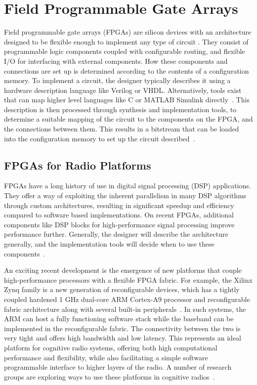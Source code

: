 \section{Field Programmable Gate Arrays }
Field programmable gate arrays (FPGAs) are silicon devices with an architecture designed to be flexible enough to implement any type of circuit \cite{Kuon2008}.
They consist of programmable logic components coupled with configurable routing, and flexible I/O for interfacing with external components.
How these components and connections are set up is determined according to the contents of a configuration memory.
To implement a circuit, the designer typically describes it using a hardware description language like Verilog or VHDL.
Alternatively, tools exist that can map higher level languages like C or MATLAB Simulink directly~\cite{Springer2008}.
This description is then processed through synthesis and implementation tools, to determine a suitable mapping of the circuit to the components on the FPGA, and the connections between them.
This results in a bitstream that can be loaded into the configuration memory to set up the circuit described~\cite{Xilinx2013c}.
\subsection{FPGAs for Radio Platforms}
FPGAs have a long history of use in digital signal processing (DSP) applications.
They offer a way of exploiting the inherent parallelism in many DSP algorithms through custom architectures, resulting in significant speedup and efficiency compared to software based implementations.
On recent FPGAs, additional components like DSP blocks for high-performance signal processing improve performance further.
Generally, the designer will describe the architecture generally, and the implementation tools will decide when to use these components~\cite{Xilinx2013d}.

An exciting recent development is the emergence of new platforms that couple high-performance processors with a flexible FPGA fabric.
For example, the Xilinx Zynq family is a new generation of reconfigurable devices, which has a tightly coupled hardened 1 GHz dual-core ARM Cortex-A9 processor and reconfigurable fabric architecture along with several built-in peripherals~\cite{Xilinx2013}.
In such systems, the ARM can host a fully functioning software stack while the baseband can be implemented in the reconfigurable fabric. The connectivity between the two is very tight and offers high bandwidth and low latency. This represents an ideal platform for cognitive radio systems, offering both high computational performance and flexibility, while also facilitating a simple software programmable interface to higher layers of the radio.
A number of research groups are exploring ways to use these platforms in cognitive radios~\cite{Dobson2014}.

